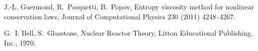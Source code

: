 \documentclass[xchauthor,chkrefs,fixeqskip,GCNS,amsmath,amsthm]{yjcphg}
\theoremstyle{remark}
\begin{document}
%
\begin{backmatter}%
%
\begin{thebibliography}{}

\begin{bsubitem}
\begin{bcontribution}%
\end{bcontribution}
\begin{bhost}
\begin{bissue}
\end{bissue}
\end{bhost}
\end{bsubitem}
%
\OrigBibText
J.-L. Guermond, R.~Pasquetti, B.~Popov, Entropy viscosity method for
nonlinear conservation laws, Journal of Computational Physics 230 (2011)
4248--4267.
\endOrigBibText
{}%
\endbibitem

\begin{bsubitem}
\begin{bcontribution}%
\end{bcontribution}
\begin{bhost}
\begin{bbook}
\end{bbook}
\end{bhost}
\end{bsubitem}
%
\OrigBibText
G.~I. Bell, S.~Glasstone, Nuclear Reactor Theory, Litton Educational
Publishing, Inc., 1970.
\endOrigBibText
{}%
\endbibitem


\end{thebibliography}
\end{backmatter}
\end{document}
